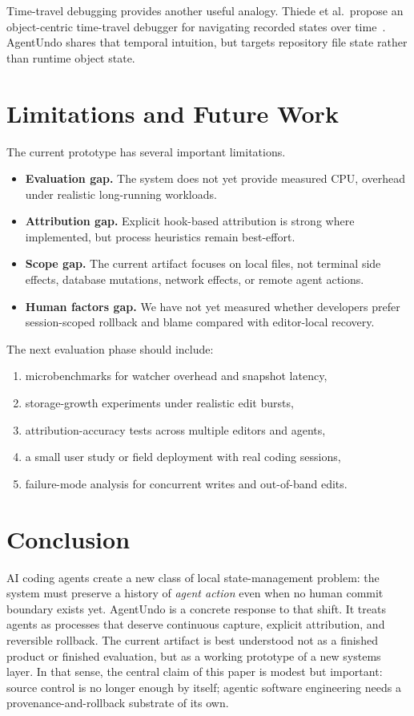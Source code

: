 \documentclass[10pt,a4paper]{article}
\begin{document}
Time-travel debugging provides another useful analogy. Thiede et al.\ propose an
object-centric time-travel debugger for navigating recorded states over
time~\cite{thiede2023objectcentric}. AgentUndo shares that temporal intuition,
but targets repository file state rather than runtime object state.

\section{Limitations and Future Work}

The current prototype has several important limitations.

\begin{itemize}
  \item \textbf{Evaluation gap.} The system does not yet provide measured CPU,
  overhead under realistic long-running workloads.
  \item \textbf{Attribution gap.} Explicit hook-based attribution is strong
  where implemented, but process heuristics remain best-effort.
  \item \textbf{Scope gap.} The current artifact focuses on local files, not
  terminal side effects, database mutations, network effects, or remote agent
  actions.
  \item \textbf{Human factors gap.} We have not yet measured whether developers
  prefer session-scoped rollback and blame compared with editor-local recovery.
\end{itemize}

The next evaluation phase should include:

\begin{enumerate}
  \item microbenchmarks for watcher overhead and snapshot latency,
  \item storage-growth experiments under realistic edit bursts,
  \item attribution-accuracy tests across multiple editors and agents,
  \item a small user study or field deployment with real coding sessions,
  \item failure-mode analysis for concurrent writes and out-of-band edits.
\end{enumerate}

\section{Conclusion}

AI coding agents create a new class of local state-management problem: the
system must preserve a history of \emph{agent action} even when no human commit
boundary exists yet. AgentUndo is a concrete response to that shift. It treats
agents as processes that deserve continuous capture, explicit attribution, and
reversible rollback. The current artifact is best understood not as a finished
product or finished evaluation, but as a working prototype of a new systems
layer. In that sense, the central claim of this paper is modest but important:
source control is no longer enough by itself; agentic software engineering
needs a provenance-and-rollback substrate of its own.



\end{document}
